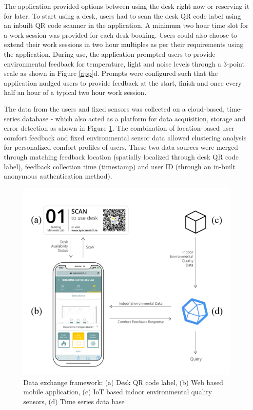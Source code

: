 \documentclass[]{interact}
\theoremstyle{plain}%
\theoremstyle{definition}
\theoremstyle{remark}
\begin{document}
The application provided options between using the desk right now or reserving it for later. To start using a desk, users had to scan the desk QR code label using an inbuilt QR code scanner in the application. A minimum two hour time slot for a work session was provided for each desk booking. Users could also choose to extend their work sessions in two hour multiples as per their requirements using the application. During use, the application prompted users to provide environmental feedback for temperature, light and noise levels through a 3-point scale as shown in Figure \ref{app}d. Prompts were configured such that the application nudged users to provide feedback at the start, finish and once every half an hour of a typical two hour work session. 

The data from the users and fixed sensors was collected on a cloud-based, time-series database - which also acted as a platform for data acquisition, storage and error detection as shown in Figure \ref{framework}. The combination of location-based user comfort feedback and fixed environmental sensor data allowed clustering analysis for personalized comfort profiles of users. These two data sources were merged through matching feedback location (spatially localized through desk QR code label), feedback collection time (timestamp) and user ID (through an in-built anonymous authentication method).     

\begin{figure}[ht!]
\centering
\includegraphics[scale=0.1]{figures/framework.jpg}
\caption{Data exchange framework: (a) Desk QR code label, (b) Web based mobile application, (c) IoT based indoor environmental quality sensors, (d) Time series data base} 
\label{framework}
\end{figure}
\end{document}
